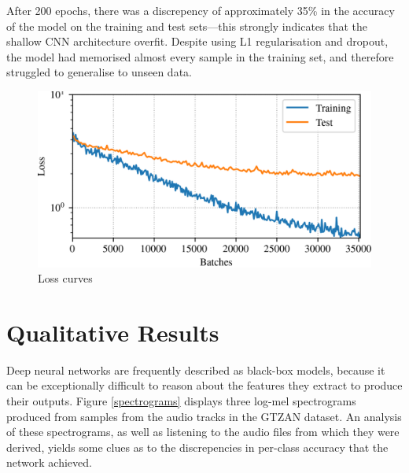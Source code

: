 \documentclass[conference]{IEEEtran}
\begin{document}
After 200 epochs, there was a discrepency of approximately 35\% in the accuracy of the model on the training and test sets---this strongly indicates that the shallow CNN architecture overfit.
Despite using L1 regularisation and dropout, the model had memorised almost every sample in the training set, and therefore struggled to generalise to unseen data.

\begin{figure}[htbp]
    \centerline{\includegraphics[width=\columnwidth]{loss.png}}
    \caption{Loss curves}
    \label{loss_curves}
\end{figure}

\section{Qualitative Results}

Deep neural networks are frequently described as black-box models, because it can be exceptionally difficult to reason about the features they extract to produce their outputs.
Figure \ref{spectrograms} displays three log-mel spectrograms produced from samples from the audio tracks in the GTZAN dataset.
An analysis of these spectrograms, as well as listening to the audio files from which they were derived, yields some clues as to the discrepencies in per-class accuracy that the network achieved.
\end{document}
